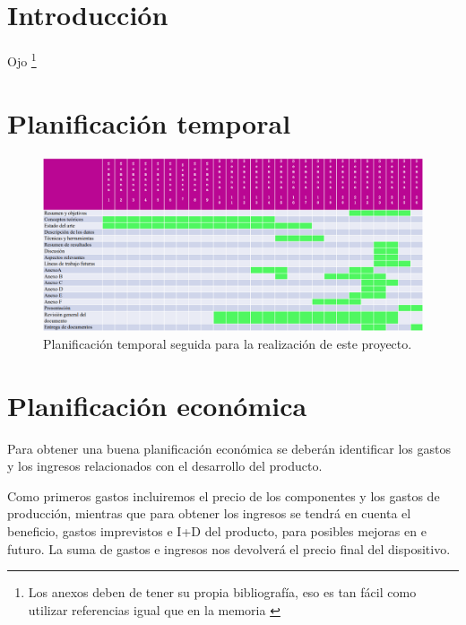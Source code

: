 
\section{Introducción}

Ojo \footnote{Los anexos deben de tener su propia bibliografía, eso es tan fácil como utilizar referencias igual que en la memoria \cite{bortolot2005}}

\section{Planificación temporal}
\begin{figure}[h]
    \centering
    \includegraphics[width=1\textwidth]{img/PlanificacionTemporal.png}
    \caption{Planificación temporal seguida para la realización de este proyecto.}
    \label{fig:planTemporal} %
\end{figure}

\section{Planificación económica}
Para obtener una buena planificación económica se deberán identificar los gastos y los ingresos relacionados con el desarrollo del producto.

Como primeros gastos incluiremos el precio de los componentes y los gastos de producción, mientras que para obtener los ingresos se tendrá en cuenta el beneficio, gastos imprevistos e I+D del producto, para posibles mejoras en e futuro. La suma de gastos e ingresos nos devolverá el precio final del dispositivo.


